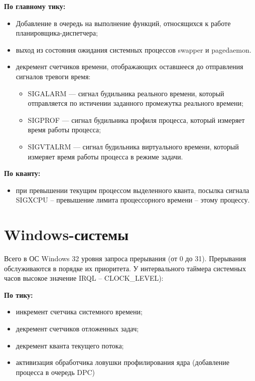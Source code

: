 \textbf{По главному тику:}
\begin{itemize}
	\item Добавление в очередь на выполнение функций, относящихся к работе планировщика-диспетчера;
	\item выход из состояния ожидания системных процессов {\ttfamily swapper} и {\ttfamily pagedaemon}.
	\item декремент счетчиков времени, отображающих оставшееся до отправления сигналов тревоги время:
	\begin{itemize}
		\item {\ttfamily SIGALARM} --- сигнал будильника реального времени, который отправляется по истичении заданного промежутка реального времени;
		\item {\ttfamily SIGPROF} --- сигнал будильника профиля процесса, который измеряет время работы процесса;
		\item {\ttfamily SIGVTALRM} --- сигнал будильника виртуального времени, который измеряет время работы процесса в режиме задачи.
	\end{itemize}
\end{itemize}

\textbf{По кванту:}
\begin{itemize}
	\item при превышении текущим процессом выделенного кванта, посылка сигнала {\ttfamily SIGXCPU} -- превышение лимита процессорного времени -- этому процессу.
\end{itemize}

\section{Windows-системы}

Всего в ОС Windows 32 уровня запроса прерывания (от 0 до 31). Прерывания обслуживаются в порядке их приоритета. У интервального таймера системных часов высокое значение {\ttfamily IRQL} – {\ttfamily CLOCK\_LEVEL}):

\textbf{По тику:}
\begin{itemize}
	\item инкремент счетчика системного времени;
	\item декремент счетчиков отложенных задач;
	\item декремент кванта текущего потока;
	\item активизация обработчика ловушки профилирования ядра (добавление процесса в очередь {\ttfamily DPC})
\end{itemize}


